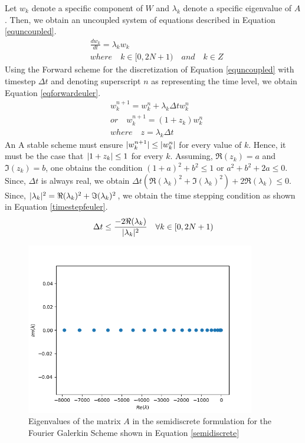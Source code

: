 \documentclass[12pt,dvipsnames]{article}
\DeclarePairedDelimiter\abs{\lvert}{\rvert}
\begin{document}
Let $w_k$ denote a specific component of $W$ and $\lambda_k$ denote a specific eigenvalue of $A$. Then, we obtain an uncoupled system of equations described in Equation \ref{equncoupled}.
\begin{equation}
\begin{aligned}
    & \frac{dw_k}{dt} = \lambda_k w_k \\
    & where \quad k \in [0, 2N + 1) \quad and \quad k \in Z
\end{aligned}
    \label{equncoupled}
\end{equation}
Using the Forward scheme for the discretization of Equation \ref{equncoupled} with timestep $\Delta t$ and denoting superscript $n$ as representing the time level, we obtain Equation \ref{eqforwardeuler}.
\begin{equation}
    \begin{aligned}
       & w_k^{n + 1} = w_k^{n} + \lambda_k \Delta t w_k^n \\
       & or \quad w_k^{n + 1} = (1 + z_k) w_k^{n} \\
       & where \quad z = \lambda_k \Delta t
    \end{aligned}
\label{eqforwardeuler}
\end{equation}
An A stable scheme must ensure $\abs{ w_k^{n + 1} } \leq \abs{ w_k^n }$ for every value of $k$. Hence, it must be the case that $\abs{1 + z_k} \leq 1$ for every $k$. Assuming, $\Re(z_k) = a$ and $\Im(z_k) = b$, one obtains the condition $(1 + a)^2 + b^2 \leq 1$ or $a^2 + b^2 + 2a \leq 0$. Since, $\Delta t$ is always real, we obtain $\Delta t( \Re(\lambda_k)^2 + \Im(\lambda_k)^2  ) + 2 \Re(\lambda_k) \leq 0$. Since, $\abs{\lambda_k}^2 = \Re(\lambda_k)^2 + \Im(\lambda_k)^2$, we obtain the time stepping condition as shown in Equation \ref{timestepfeuler}.
\begin{equation}
    \Delta t \leq \frac{-2 \Re(\lambda_k)}{\abs{\lambda_k}^2} \quad \forall k \in [0, 2N + 1)
    \label{timestepfeuler}
\end{equation}
\begin{figure}
    \centering
    \includegraphics[width=10cm]{eigenplot_u_Q1.png}
    \caption{Eigenvalues of the matrix $A$ in the semidiscrete formulation for the Fourier Galerkin Scheme shown in Equation \ref{semidiscrete}}
    \label{eigenplot_Q1}
\end{figure}
\end{document}
